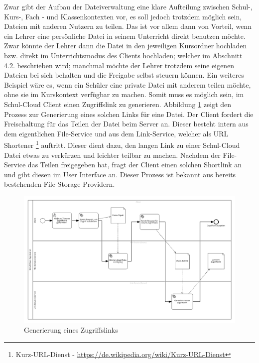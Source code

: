 Zwar gibt der Aufbau der Dateiverwaltung eine klare Aufteilung zwischen Schul-, Kurs-, Fach - und Klassenkontexten vor, es soll jedoch trotzdem möglich sein, Dateien mit anderen Nutzern zu teilen. Das ist vor allem dann von Vorteil, wenn ein Lehrer eine persönliche Datei in seinem Unterricht direkt benutzen möchte. Zwar könnte der Lehrer dann die Datei in den jeweiligen Kursordner hochladen bzw. direkt im Unterrichtsmodus des Clients hochladen; welcher im Abschnitt 4.2. beschrieben wird; manchmal möchte der Lehrer trotzdem seine eigenen Dateien bei sich behalten und die Freigabe selbst steuern können. Ein weiteres Beispiel wäre es, wenn ein Schüler eine private Datei mit anderem teilen möchte, ohne sie im Kurskontext verfügbar zu machen. Somit muss es möglich sein, im Schul-Cloud Client einen Zugriffslink zu generieren. Abbildung \ref{fig:filesharinggeneration} zeigt den Prozess zur Generierung eines solchen Links für eine Datei. Der Client fordert die Freischaltung für das Teilen der Datei beim Server an. Dieser besteht intern aus dem eigentlichen File-Service und aus dem Link-Service, welcher als URL  Shortener \footnote{Kurz-URL-Dienst - \url{https://de.wikipedia.org/wiki/Kurz-URL-Dienst}} auftritt. Dieser dient dazu, den langen Link zu einer Schul-Cloud Datei etwas zu verkürzen und leichter teilbar zu machen. Nachdem der File-Service das Teilen freigegeben hat, fragt der Client einen solchen Shortlink an und gibt diesen im User Interface an. Dieser Prozess ist bekannt aus bereits bestehenden File Storage Providern.

\begin{figure}[H]
	\includegraphics[width=1\linewidth]{images/filesharinggeneration}
	\caption[Caption for concept]{Generierung eines Zugriffslinks}
	\centering
	\label{fig:filesharinggeneration}
\end{figure}

